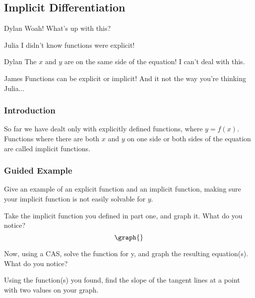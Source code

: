 \documentclass{ximera}
\begin{document}
\subsection{Implicit Differentiation}
\begin{dialogue}
\item[Dylan] Woah! What's up with this?
\item[Julia] I didn't know functions were explicit!
\item[Dylan] The $x$ and $y$ are on the same side of the equation! I can't deal with this.
\item[James] Functions can be explicit or implicit! And it not the way you're thinking Julia...
\end{dialogue}
\subsubsection{Introduction}
So far we have dealt only with explicitly defined functions, where $y=f(x)$.  Functions where there are both $x$ and $y$ on one side or both sides of the equation are called implicit functions.
\subsubsection{Guided Example}
\begin{question}
Give an example of an explicit function and an implicit function, making sure your implicit function is not easily solvable for $y$.
\begin{freeResponse}
\end{freeResponse}
\end{question}
\begin{question}
Take the implicit function you defined in part one, and graph it. What do you notice?
\[
\graph{}
\]
\begin{freeResponse}
\end{freeResponse}
\end{question}
\begin{question}
Now, using a CAS, solve the function for y, and graph the resulting equation(s). What do you notice?
\begin{freeResponse}
\end{freeResponse}
\end{question}
\begin{question}
Using the function(s) you found, find the slope of the tangent lines at a point with two values on your graph.
\begin{freeResponse}
\end{freeResponse}
\end{question}
\setcounter{problem}{0}
\end{document}
